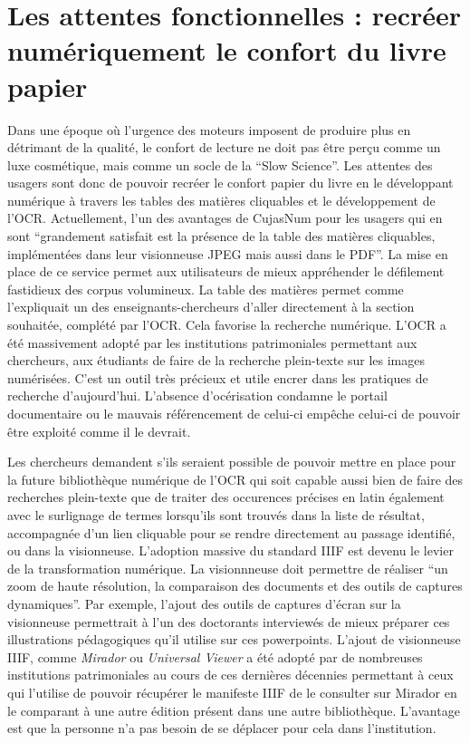 \section[Les attentes fonctionnelles]{Les attentes fonctionnelles : recréer numériquement le confort du livre papier}
Dans une époque où l'urgence des moteurs imposent de produire plus en détrimant de la qualité, le confort de lecture ne doit pas être perçu comme un luxe cosmétique, mais comme un socle de la \enquote{Slow Science}. Les attentes des usagers sont donc de pouvoir recréer le confort papier du livre en le développant numérique à travers les tables des matières cliquables et le développement de l'OCR. Actuellement, l'un des avantages de CujasNum pour les usagers qui en sont \enquote{grandement satisfait est la présence de la table des matières cliquables, implémentées dans leur visionneuse JPEG mais aussi dans le PDF}. La mise en place de ce service permet aux utilisateurs de mieux appréhender le défilement fastidieux des corpus volumineux. La table des matières permet comme l'expliquait un des enseignants-chercheurs d'aller directement à la section souhaitée, complété par l'OCR. Cela favorise la recherche numérique. L'OCR a été massivement adopté par les institutions patrimoniales permettant aux chercheurs, aux étudiants de faire de la recherche plein-texte sur les images numérisées. C'est un outil très précieux et utile encrer dans les pratiques de recherche d'aujourd'hui. L'absence d'océrisation condamne le portail documentaire ou le mauvais référencement de celui-ci empêche celui-ci de pouvoir être exploité comme il le devrait. 

Les chercheurs demandent s'ils seraient possible de pouvoir mettre en place pour la future bibliothèque numérique de l'OCR qui soit capable aussi bien de faire des recherches plein-texte que de traiter des occurences précises en latin également avec le surlignage de termes lorsqu'ils sont trouvés dans la liste de résultat, accompagnée d'un lien cliquable pour se rendre directement au passage identifié, ou dans la visionneuse. L'adoption massive du standard IIIF est devenu le levier de la transformation numérique. La visionnneuse doit permettre de réaliser \enquote{un zoom de haute résolution, la comparaison des documents et des outils de captures dynamiques}. Par exemple, l'ajout des outils de captures d'écran sur la visionneuse permettrait à l'un des doctorants interviewés de mieux préparer ces illustrations pédagogiques qu'il utilise sur ces powerpoints. L'ajout de visionneuse IIIF, comme \textit{Mirador} ou \textit{Universal Viewer} a été adopté par de nombreuses institutions patrimoniales au cours de ces dernières décennies permettant à ceux qui l'utilise de pouvoir récupérer le manifeste IIIF de le consulter sur Mirador en le comparant à une autre édition présent dans une autre bibliothèque. L'avantage est que la personne n'a pas besoin de se déplacer pour cela dans l'institution. 

